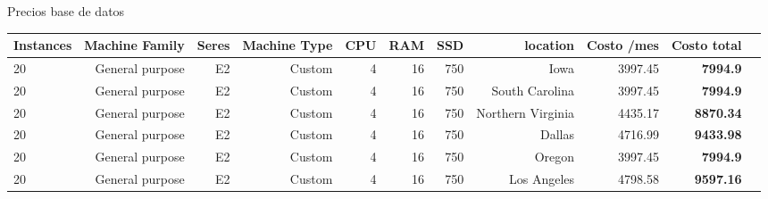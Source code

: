 \documentclass{article}
\begin{document}
\begin{adjustwidth}{-2.5 cm}{-2.5 cm}\centering\begin{threeparttable}[!htb]
\caption{Precios base de datos}\label{tab: }
\scriptsize
\begin{tabular}{lrrrrrrrrrr}\toprule
\cellcolor[HTML]{f1c232}Instances &\cellcolor[HTML]{f1c232}Machine Family &\cellcolor[HTML]{f1c232}Seres &\cellcolor[HTML]{f1c232}Machine Type &\cellcolor[HTML]{f1c232}CPU &\cellcolor[HTML]{f1c232}RAM &\cellcolor[HTML]{f1c232}SSD &\cellcolor[HTML]{f1c232}location &\cellcolor[HTML]{f1c232}Costo /mes &\cellcolor[HTML]{f1c232}Costo total \\\midrule
\cellcolor[HTML]{ffd966}20 &\cellcolor[HTML]{ffd966}General purpose &\cellcolor[HTML]{ffd966}E2 &\cellcolor[HTML]{ffd966}Custom &\cellcolor[HTML]{ffd966}4 &\cellcolor[HTML]{ffd966}16 &\cellcolor[HTML]{ffd966}750 &\cellcolor[HTML]{ffd966}Iowa &\cellcolor[HTML]{ffd966}3997.45 &\cellcolor[HTML]{ffff00}\textbf{7994.9} \\
\cellcolor[HTML]{ffd966}20 &\cellcolor[HTML]{ffd966}General purpose &\cellcolor[HTML]{ffd966}E2 &\cellcolor[HTML]{ffd966}Custom &\cellcolor[HTML]{ffd966}4 &\cellcolor[HTML]{ffd966}16 &\cellcolor[HTML]{ffd966}750 &\cellcolor[HTML]{ffd966}South Carolina &\cellcolor[HTML]{ffd966}3997.45 &\cellcolor[HTML]{ffff00}\textbf{7994.9} \\
\cellcolor[HTML]{ffd966}20 &\cellcolor[HTML]{ffd966}General purpose &\cellcolor[HTML]{ffd966}E2 &\cellcolor[HTML]{ffd966}Custom &\cellcolor[HTML]{ffd966}4 &\cellcolor[HTML]{ffd966}16 &\cellcolor[HTML]{ffd966}750 &\cellcolor[HTML]{ffd966}Northern Virginia &\cellcolor[HTML]{ffd966}4435.17 &\cellcolor[HTML]{ffd966}\textbf{8870.34} \\
\cellcolor[HTML]{ffd966}20 &\cellcolor[HTML]{ffd966}General purpose &\cellcolor[HTML]{ffd966}E2 &\cellcolor[HTML]{ffd966}Custom &\cellcolor[HTML]{ffd966}4 &\cellcolor[HTML]{ffd966}16 &\cellcolor[HTML]{ffd966}750 &\cellcolor[HTML]{ffd966}Dallas &\cellcolor[HTML]{ffd966}4716.99 &\cellcolor[HTML]{ffd966}\textbf{9433.98} \\
\cellcolor[HTML]{ffd966}20 &\cellcolor[HTML]{ffd966}General purpose &\cellcolor[HTML]{ffd966}E2 &\cellcolor[HTML]{ffd966}Custom &\cellcolor[HTML]{ffd966}4 &\cellcolor[HTML]{ffd966}16 &\cellcolor[HTML]{ffd966}750 &\cellcolor[HTML]{ffd966}Oregon &\cellcolor[HTML]{ffd966}3997.45 &\cellcolor[HTML]{ffff00}\textbf{7994.9} \\
\cellcolor[HTML]{ffd966}20 &\cellcolor[HTML]{ffd966}General purpose &\cellcolor[HTML]{ffd966}E2 &\cellcolor[HTML]{ffd966}Custom &\cellcolor[HTML]{ffd966}4 &\cellcolor[HTML]{ffd966}16 &\cellcolor[HTML]{ffd966}750 &\cellcolor[HTML]{ffd966}Los Angeles &\cellcolor[HTML]{ffd966}4798.58 &\cellcolor[HTML]{ffd966}\textbf{9597.16} \\

\end{tabular}
\end{threeparttable}
\end{adjustwidth}
\end{document}
